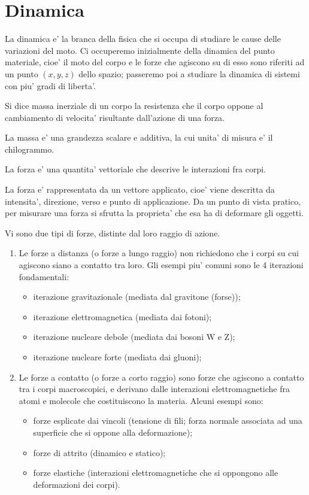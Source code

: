 \chapter{Dinamica}

La dinamica e' la branca della fisica che si occupa di studiare le cause delle variazioni del moto. Ci occuperemo inizialmente della dinamica del punto materiale, cioe' il moto del corpo e le forze che agiscono su di esso sono riferiti ad un punto $(x, y, z)$ dello spazio; passeremo poi a studiare la dinamica di sistemi con piu' gradi di liberta'.

\begin{definition}
    Si dice massa inerziale di un corpo la resistenza che il corpo oppone al cambiamento di velocita' risultante dall'azione di una forza.    
\end{definition}
La massa e' una grandezza scalare e additiva, la cui unita' di misura e' il chilogrammo.

\begin{definition}
    La forza e' una quantita' vettoriale che descrive le interazioni fra corpi.
\end{definition}
La forza e' rappresentata da un vettore applicato, cioe' viene descritta da intensita', direzione, verso e punto di applicazione. Da un punto di vista pratico, per misurare una forza si sfrutta la proprieta' che esa ha di deformare gli oggetti.

Vi sono due tipi di forze, distinte dal loro raggio di azione.
\begin{enumerate}
    \item Le forze a distanza (o forze a lungo raggio) non richiedono che i corpi su cui agiscono siano a contatto tra loro. Gli esempi piu' comuni sono le 4 iterazioni fondamentali:
        \begin{itemize}
            \item iterazione gravitazionale (mediata dal gravitone (forse));
            \item iterazione elettromagnetica (mediata dai fotoni);
            \item iterazione nucleare debole (mediata dai bosoni W e Z);
            \item iterazione nucleare forte (mediata dai gluoni);
        \end{itemize}
    \item Le forze a contatto (o forze a corto raggio) sono forze che agiscono a contatto tra i corpi macroscopici, e derivano dalle interazioni elettromagnetiche fra atomi e molecole che costituiscono la materia. Alcuni esempi sono:
        \begin{itemize}
            \item forze esplicate dai vincoli (tensione di fili; forza normale associata ad una superficie che si oppone alla deformazione);
            \item forze di attrito (dinamico e statico);
            \item forze elastiche (interazioni elettromagnetiche che si oppongono alle deformazioni dei corpi).
        \end{itemize}
\end{enumerate}

